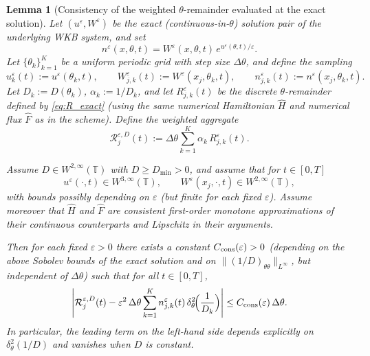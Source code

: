 \documentclass[11pt, dina4, amsfont12]{article}
\newtheorem{lemma}{Lemma}[section]
\begin{document}


\begin{lemma}[Consistency of the weighted $\theta$-remainder evaluated at the exact solution]
\label{lem:consistency_R_divD}
Let $(u^\varepsilon,W^\varepsilon)$ be the {\rm exact} (continuous-in-$\theta$) solution pair of the
underlying WKB system, and set
\[
n^\varepsilon(x,\theta,t)=W^\varepsilon(x,\theta,t)\,e^{u^\varepsilon(\theta,t)/\varepsilon}.
\]
Let $\{\theta_k\}_{k=1}^K$ be a uniform periodic grid with step size $\Delta\theta$, and define the
sampling
\[
u_k^\varepsilon(t):=u^\varepsilon(\theta_k,t),\qquad
W_{j,k}^\varepsilon(t):=W^\varepsilon(x_j,\theta_k,t),\qquad
n_{j,k}^\varepsilon(t):=n^\varepsilon(x_j,\theta_k,t).
\]
Let $D_k:=D(\theta_k)$, $\alpha_k:=1/D_k$, and let $R_{j,k}^\varepsilon(t)$ be the discrete
$\theta$-remainder defined by \eqref{eq:R_exact} (using the same numerical Hamiltonian $\widehat H$
and numerical flux $\widehat F$ as in the scheme). Define the weighted aggregate
\[
\mathcal R_{j}^{\varepsilon,D}(t)
:=\Delta\theta\sum_{k=1}^K \alpha_k\,R_{j,k}^\varepsilon(t).
\]

Assume $D\in W^{2,\infty}(\mathbb T)$ with $D\ge D_{\min}>0$, and assume that for $t\in[0,T]$
\[
u^\varepsilon(\cdot,t)\in W^{3,\infty}(\mathbb T),\qquad
W^\varepsilon(x_j,\cdot,t)\in W^{2,\infty}(\mathbb T),
\]
with bounds possibly depending on $\varepsilon$ (but finite for each fixed $\varepsilon$).
Assume moreover that $\widehat H$ and $\widehat F$ are consistent first-order monotone
approximations of their continuous counterparts and Lipschitz in their arguments.

Then for each fixed $\varepsilon>0$ there exists a constant $C_{\rm cons}(\varepsilon)>0$
(depending on the above Sobolev bounds of the exact solution and on
$\|(1/D)_{\theta\theta}\|_{L^\infty}$, but independent of $\Delta\theta$) such that
for all $t\in[0,T]$,
\begin{equation}\label{eq:consistency_main}
\left|
\mathcal R_{j}^{\varepsilon,D}(t)
-\varepsilon^2\,\Delta\theta\sum_{k=1}^K n_{j,k}^\varepsilon(t)\,\delta_\theta^2\!\Bigl(\frac1{D_k}\Bigr)
\right|
\le
C_{\rm cons}(\varepsilon)\,\Delta\theta.
\end{equation}
In particular, the leading term on the left-hand side depends explicitly on
$\delta_\theta^2(1/D)$ and vanishes when $D$ is constant.
\end{lemma}
\end{document}
